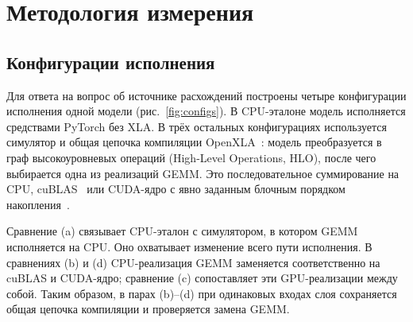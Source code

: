 \section{Методология измерения}
\label{sec:method}

\subsection{Конфигурации исполнения}
\label{sec:sources}

Для ответа на вопрос об источнике расхождений построены четыре
конфигурации исполнения одной модели (рис.~\ref{fig:configs}).
В CPU-эталоне модель исполняется средствами PyTorch без XLA.
В трёх остальных конфигурациях используется симулятор и общая цепочка
компиляции OpenXLA~\cite{OpenXLA2023}: модель преобразуется в граф
высокоуровневых операций (High-Level Operations, HLO), после чего
выбирается одна из реализаций GEMM. Это последовательное суммирование
на CPU, cuBLAS~\cite{cuBLAS2024} или CUDA-ядро с явно заданным
блочным порядком накопления~\cite{CUDA2024}.

Сравнение (a) связывает CPU-эталон с симулятором, в котором GEMM
исполняется на CPU. Оно охватывает изменение всего пути исполнения.
В сравнениях (b) и (d) CPU-реализация GEMM заменяется соответственно
на cuBLAS и CUDA-ядро; сравнение (c) сопоставляет эти GPU-реализации
между собой. Таким образом, в парах (b)--(d) при одинаковых входах слоя сохраняется
общая цепочка компиляции и проверяется замена GEMM.

